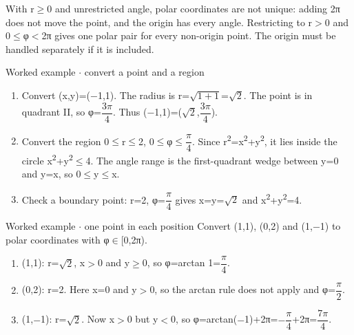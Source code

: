 \documentclass[11pt]{article}
\begin{document}
\begin{keepsection}
With r\ensuremath{\geq}0 and unrestricted angle, polar coordinates are not unique: adding 2π does not move the point, and the origin has every angle. Restricting to r\ensuremath{>}0 and 0\ensuremath{\leq}φ\ensuremath{<}2π gives one polar pair for every non-origin point. The origin must be handled separately if it is included.

\begin{workedbox}{Worked example \ensuremath{\cdot} convert a point and a region}
\begin{enumerate}
\item Convert (x,y)=(\ensuremath{-}1,1). The radius is r=\ensuremath{\sqrt{1+1}}=\ensuremath{\sqrt{2}}. The point is in quadrant II, so φ={\small\ensuremath{\dfrac{3π}{4}}}. Thus (\ensuremath{-}1,1)=(\ensuremath{\sqrt{2}},{\small\ensuremath{\dfrac{3π}{4}}}).
\item Convert the region 0\ensuremath{\leq}r\ensuremath{\leq}2, 0\ensuremath{\leq}φ\ensuremath{\leq}{\small\ensuremath{\dfrac{π}{4}}}. Since r\textsuperscript{2}=x\textsuperscript{2}+y\textsuperscript{2}, it lies inside the circle x\textsuperscript{2}+y\textsuperscript{2}\ensuremath{\leq}4. The angle range is the first-quadrant wedge between y=0 and y=x, so 0\ensuremath{\leq}y\ensuremath{\leq}x.
\item Check a boundary point: r=2, φ={\small\ensuremath{\dfrac{π}{4}}} gives x=y=\ensuremath{\sqrt{2}} and x\textsuperscript{2}+y\textsuperscript{2}=4.
\end{enumerate}
\end{workedbox}

\begin{workedbox}{Worked example \ensuremath{\cdot} one point in each position}
Convert (1,1), (0,2) and (1,\ensuremath{-}1) to polar coordinates with φ\ensuremath{\in}[0,2π).

\begin{enumerate}
\item (1,1): r=\ensuremath{\sqrt{2}}, x\ensuremath{>}0 and y\ensuremath{\geq}0, so φ=arctan 1={\small\ensuremath{\dfrac{π}{4}}}.
\item (0,2): r=2. Here x=0 and y\ensuremath{>}0, so the arctan rule does not apply and φ={\small\ensuremath{\dfrac{π}{2}}}.
\item (1,\ensuremath{-}1): r=\ensuremath{\sqrt{2}}. Now x\ensuremath{>}0 but y\ensuremath{<}0, so φ=arctan(\ensuremath{-}1)+2π=\ensuremath{-}{\small\ensuremath{\dfrac{π}{4}}}+2π={\small\ensuremath{\dfrac{7π}{4}}}.
\end{enumerate}


\end{workedbox}
\end{keepsection}
\end{document}
